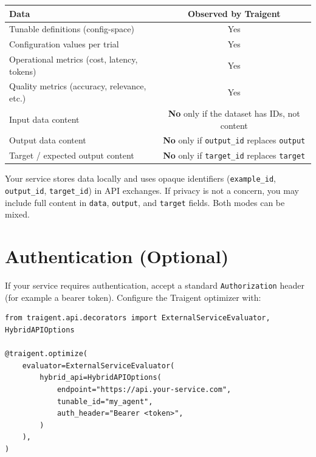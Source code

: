 \documentclass[11pt,a4paper]{article}
\newcommand{\field}[1]{\texttt{#1}}
\begin{document}
\begin{center}
\small
\begin{tabular}{@{}lc@{}}
\toprule
\textbf{Data} & \textbf{Observed by Traigent} \\
\midrule
Tunable definitions (config-space)             & Yes \\
Configuration values per trial                 & Yes \\
Operational metrics (cost, latency, tokens)    & Yes \\
Quality metrics (accuracy, relevance, etc.)    & Yes \\
Input data content                             & \textcolor{privacygreen}{\textbf{No}} only if the dataset has IDs, not content \\
Output data content                            & \textcolor{privacygreen}{\textbf{No}} only if \field{output\_id} replaces \field{output} \\
Target / expected output content               & \textcolor{privacygreen}{\textbf{No}} only if \field{target\_id} replaces \field{target} \\
\bottomrule
\end{tabular}
\end{center}

Your service stores data locally and uses opaque identifiers
(\field{example\_id}, \field{output\_id}, \field{target\_id}) in API exchanges.
If privacy is not a concern, you may include full content in \field{data},
\field{output}, and \field{target} fields. Both modes can be mixed.

\section{Authentication (Optional)}

If your service requires authentication, accept a standard
\texttt{Authorization} header (for example a bearer token). Configure the
Traigent optimizer with:

\begin{lstlisting}[basicstyle=\ttfamily\small]
from traigent.api.decorators import ExternalServiceEvaluator, HybridAPIOptions

@traigent.optimize(
    evaluator=ExternalServiceEvaluator(
        hybrid_api=HybridAPIOptions(
            endpoint="https://api.your-service.com",
            tunable_id="my_agent",
            auth_header="Bearer <token>",
        )
    ),
)
\end{lstlisting}
\end{document}

